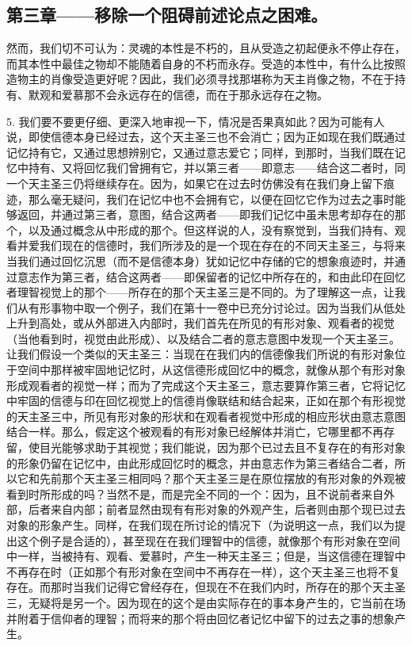 
\subsection{第三章——移除一个阻碍前述论点之困难。}

然而，我们切不可认为：灵魂的本性是不朽的，且从受造之初起便永不停止存在，而其本性中最佳之物却不能随着自身的不朽而永存。受造的本性中，有什么比按照造物主的肖像受造更好呢？因此，我们必须寻找那堪称为天主肖像之物，不在于持有、默观和爱慕那不会永远存在的信德，而在于那永远存在之物。\par

5. 我们要不要更仔细、更深入地审视一下，情况是否果真如此？因为可能有人说，即使信德本身已经过去，这个天主圣三也不会消亡；因为正如现在我们既通过记忆持有它，又通过思想辨别它，又通过意志爱它；同样，到那时，当我们既在记忆中持有、又将回忆我们曾拥有它，并以第三者——即意志——结合这二者时，同一个天主圣三仍将继续存在。因为，如果它在过去时仿佛没有在我们身上留下痕迹，那么毫无疑问，我们在记忆中也不会拥有它，以便在回忆它作为过去之事时能够返回，并通过第三者，意图，结合这两者——即我们记忆中虽未思考却存在的那个，以及通过概念从中形成的那个。但这样说的人，没有察觉到，当我们持有、观看并爱我们现在的信德时，我们所涉及的是一个现在存在的不同天主圣三，与将来当我们通过回忆沉思（而不是信德本身）犹如记忆中存储的它的想象痕迹时，并通过意志作为第三者，结合这两者——即保留者的记忆中所存在的，和由此印在回忆者理智视觉上的那个——所存在的那个天主圣三是不同的。为了理解这一点，让我们从有形事物中取一个例子，我们在第十一卷中已充分讨论过。因为当我们从低处上升到高处，或从外部进入内部时，我们首先在所见的有形对象、观看者的视觉（当他看到时，视觉由此形成）、以及结合二者的意志意图中发现一个天主圣三。让我们假设一个类似的天主圣三：当现在在我们内的信德像我们所说的有形对象位于空间中那样被牢固地记忆时，从这信德形成回忆中的概念，就像从那个有形对象形成观看者的视觉一样；而为了完成这个天主圣三，意志要算作第三者，它将记忆中牢固的信德与印在回忆视觉上的信德肖像联结和结合起来，正如在那个有形视觉的天主圣三中，所见有形对象的形状和在观看者视觉中形成的相应形状由意志意图结合一样。那么，假定这个被观看的有形对象已经解体并消亡，它哪里都不再存留，使目光能够求助于其视觉；我们能说，因为那个已过去且不复存在的有形对象的形象仍留在记忆中，由此形成回忆时的概念，并由意志作为第三者结合二者，所以它和先前那个天主圣三相同吗？那个天主圣三是在原位摆放的有形对象的外观被看到时所形成的吗？当然不是，而是完全不同的一个：因为，且不说前者来自外部，后者来自内部；前者显然由现有有形对象的外观产生，后者则由那个现已过去对象的形象产生。同样，在我们现在所讨论的情况下（为说明这一点，我们以为提出这个例子是合适的），甚至现在在我们理智中的信德，就像那个有形对象在空间中一样，当被持有、观看、爱慕时，产生一种天主圣三；但是，当这信德在理智中不再存在时（正如那个有形对象在空间中不再存在一样），这个天主圣三也将不复存在。而那时当我们记得它曾经存在，但现在不在我们内时，所存在的那个天主圣三，无疑将是另一个。因为现在的这个是由实际存在的事本身产生的，它当前在场并附着于信仰者的理智；而将来的那个将由回忆者记忆中留下的过去之事的想象产生。\par

